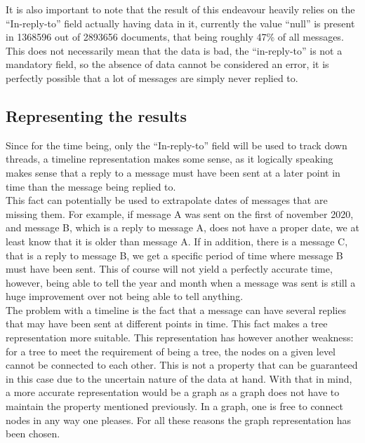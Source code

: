 \documentclass[a4paper,english]{report}
\begin{document}
It is also important to note that the result of this endeavour heavily relies on the “In-reply-to” field actually having data in it, currently the value “null” is present in 1368596 out of 2893656 documents, that being roughly 47\% of all messages. This does not necessarily mean that the data is bad, the “in-reply-to” is not a mandatory field, so the absence of data cannot be considered an error, it is perfectly possible that a lot of messages are simply never replied to.\\



\subsection{Representing the results}   

Since for the time being, only the “In-reply-to” field will be used to track down threads, a timeline representation makes some sense, as it logically speaking makes sense that a reply to a message must have been sent at a later point in time than the message being replied to.\\

This fact can potentially be used to extrapolate dates of messages that are missing them.  For example, if message A was sent on the first of november 2020, and message B, which is a reply to message A, does not have a proper date, we at least know that it is older than message A. If in addition, there is a message C, that is a reply to message B, we get a specific period of time where message B must have been sent.
This of course will not yield a perfectly accurate time, however, being able to tell the year and month when a message was sent is still a huge improvement over not being able to tell anything.\\

The problem with a timeline is the fact that a message can have several replies that may have been sent at different points in time. This fact makes a tree representation more suitable. This representation has however another weakness: for a tree to meet the requirement of being a tree, the nodes on a given level cannot be connected to each other. This is not a property that can be guaranteed in this case due to the uncertain nature of the data at hand.
With that in mind, a more accurate representation would be a graph as a graph does not have to maintain the property mentioned previously. In a graph, one is free to connect nodes in any way one pleases. 
For all these reasons the graph representation has been chosen.
\end{document}
